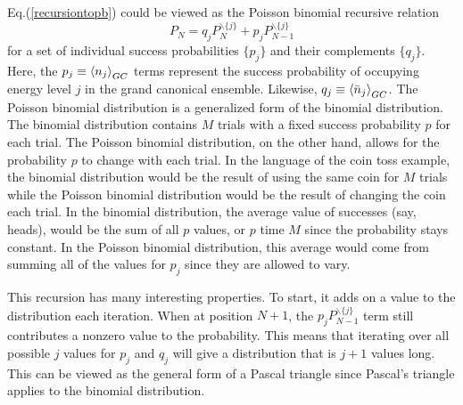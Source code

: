 Eq.\@ (\ref{recursiontopb}) could be viewed as the Poisson binomial recursive relation
\begin{equation}
    P_N=q_j  P_N^{\backslash\{j\}}+ p_j P_{N-1}^{\backslash\{j\}} \label{pbrr}
 \end{equation}
for a set of individual success probabilities $\{p_j\}$ and their complements $\{q_j\}$. Here, the $p_j\equiv \left<{n_j}\right>_{GC}$ terms represent the success probability of occupying energy level $j$ in the grand canonical ensemble. Likewise, $q_j\equiv \left<{\bar{n}_j}\right>_{GC}$. The Poisson binomial distribution is a generalized form of the binomial distribution. The binomial distribution contains $M$ trials with a fixed success probability $p$ for each trial. The Poisson binomial distribution, on the other hand, allows for the probability $p$ to change with each trial. In the language of the coin toss example, the binomial distribution would be the result of using the same coin for $M$ trials while the Poisson binomial distribution would be the result of changing the coin each trial. In the binomial distribution, the average value of successes (say, heads), would be the sum of all $p$ values, or $p$ time $M$ since the probability stays constant. In the Poisson binomial distribution, this average would come from summing all of the values for $p_j$ since they are allowed to vary. 

This recursion has many interesting properties. To start, it adds on a value to the distribution each iteration. When at position $N+1$, the $p_j P_{N-1}^{\backslash\{j\}}$ term still contributes a nonzero value to the probability. This means that iterating over all possible $j$ values for $p_j$ and $q_j$ will give a distribution that is $j+1$ values long. This can be viewed as the general form of a Pascal triangle since Pascal's triangle applies to the binomial distribution. 

